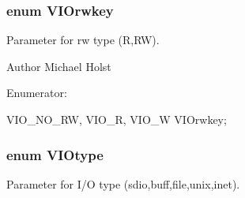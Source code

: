 \subsubsection[{VIOrwkey}]{\setlength{\rightskip}{0pt plus 5cm}enum {\bf VIOrwkey}}\label{a00028_gaf7330032d12db3359c24f79c9c2d4e24}


Parameter for rw type (R,RW). 

\begin{DoxyAuthor}{Author}
Michael Holst 
\end{DoxyAuthor}
\begin{Desc}
\item[Enumerator: ]\par
\begin{description}
\item[{\em 
VIO\_\-NO\_\-RW\label{a00028_ggaf7330032d12db3359c24f79c9c2d4e24a728233ece268770e6c75232bf7da1968}
}]\item[{\em 
VIO\_\-R\label{a00028_ggaf7330032d12db3359c24f79c9c2d4e24af463196c138c83145f7258caf84a6d92}
}]\item[{\em 
VIO\_\-W\label{a00028_ggaf7330032d12db3359c24f79c9c2d4e24a89e0bf28fada4387e3440bc18839818a}
}]\end{description}
\end{Desc}




\begin{DoxyCode}
                      {
    VIO_NO_RW,
    VIO_R,
    VIO_W
} VIOrwkey;
\end{DoxyCode}


\subsubsection[{VIOtype}]{\setlength{\rightskip}{0pt plus 5cm}enum {\bf VIOtype}}\label{a00028_gac54f991a41350084c7880d7f6192eeb9}


Parameter for I/O type (sdio,buff,file,unix,inet). 

